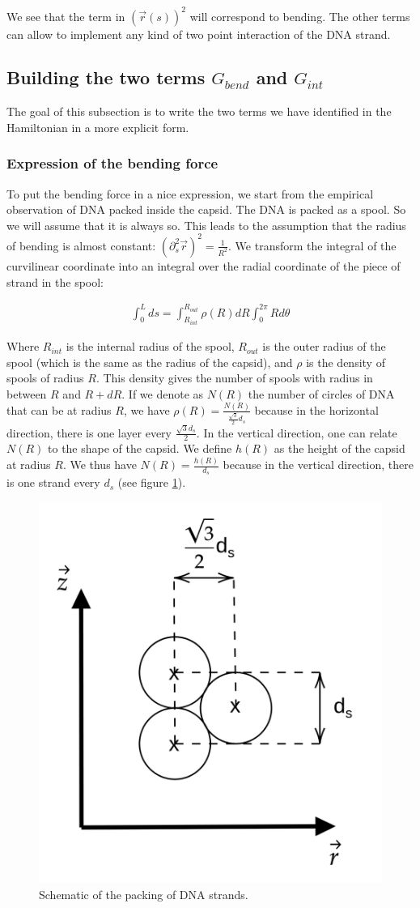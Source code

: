 \documentclass{article}
\begin{document}
We see that the term in $ \left( \vec{r}(s) \right)^2 $ will correspond to bending. The other terms can allow to implement any kind of two point interaction of the DNA strand.

\subsection{Building the two terms $G_{bend}$ and $G_{int}$}
The goal of this subsection is to write the two terms we have identified in the Hamiltonian in a more explicit form.

\subsubsection{Expression of the bending force}
To put the bending force in a nice expression, we start from the empirical observation of DNA packed inside the capsid. The DNA is packed as a spool. So we will assume that it is always so. This leads to the assumption that the radius of bending is almost constant: $\left( \partial_s^2 \vec{r} \right)^2=\frac{1}{R^2}$. We transform the integral of the curvilinear coordinate into an integral over the radial coordinate of the piece of strand in the spool:

\begin{eqnarray*}
    \int_{0}^{L} ds = \int_{R_{int}} ^{R_{out}} \rho (R) dR \int_0^{2\pi} R d \theta 
\end{eqnarray*}

Where $R_{int}$ is the internal radius of the spool, $R_{out}$ is the outer radius of the spool (which is the same as the radius of the capsid), and $\rho$ is the density of spools of radius $R$. This density gives the number of spools with radius in between $R$ and $R+ dR$. If we denote as $N(R)$ the number of circles of DNA that can be at radius $R$, we have $\rho (R) = \frac{N(R)}{\frac{\sqrt{3}}{2} d_s } $ because in the horizontal direction, there is one layer every $\frac{\sqrt{3} d_s}{2}$. In the vertical direction, one can relate $N(R)$ to the shape  of the capsid. We define $h(R)$ as the height of the capsid at radius $R$. We thus have $N(R) = \frac{h(R)}{d_s} $ because in the vertical direction, there is one strand every $d_s$ (see figure \ref{fig:hexagone}).

\begin{figure}[H]
    \centering
    \includegraphics[height=0.3\textwidth]{schema_packing.png}
    \caption{Schematic of the packing of DNA strands.}
    \label{fig:hexagone}
\end{figure}
\end{document}
